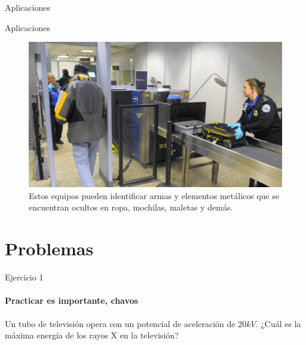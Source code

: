 \documentclass{beamer}
\begin{document}
\begin{darkframes}
\begin{frame}{Aplicaciones}
    \end{frame}
    
    \begin{frame}{Aplicaciones}
    \begin{figure}
        \centering
        \includegraphics[width = 0.9 \linewidth]{resources/19f.jpg}
        \caption{Estos equipos pueden identificar armas y elementos met\'alicos que se encuentran ocultos en ropa, mochilas, maletas y dem\'as.}
        \label{fig:my_label}
    \end{figure}
    
    \end{frame}
    
    
    \section{Problemas}
    \begin{frame}{Ejercicio 1}
    \framesubtitle{Practicar es importante, chavos}
%
      
Un tubo de televisi\'on opera con un potencial de aceleraci\'on de $20 kV$. ¿Cuál es la m\'axima energ\'ia de los rayos X en la televisi\'on?



\end{frame}
\end{darkframes}
\end{document}
